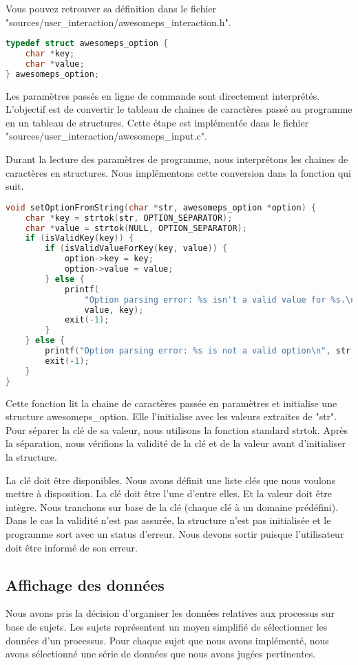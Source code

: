 Vous pouvez retrouver sa définition dans le fichier "sources/user\_interaction/awesomeps\_interaction.h".

\begin{lstlisting}[frame=single, language=c]
typedef struct awesomeps_option {
    char *key;
    char *value;
} awesomeps_option;
\end{lstlisting}

Les paramètres passés en ligne de commande sont directement interprétés. L'objectif est de convertir le tableau de chaines de caractères passé au programme en un tableau de structures. Cette étape est implémentée dans le fichier "sources/user\_interaction/awesomeps\_input.c".

Durant la lecture des paramètres de programme, nous interprétons les chaines de caractères en structures. Nous implémentons cette conversion dans la fonction qui suit.

\begin{lstlisting}[frame=single, language=c]
void setOptionFromString(char *str, awesomeps_option *option) {
    char *key = strtok(str, OPTION_SEPARATOR);
    char *value = strtok(NULL, OPTION_SEPARATOR);
    if (isValidKey(key)) {
        if (isValidValueForKey(key, value)) {
            option->key = key;
            option->value = value;
        } else {
            printf(
                "Option parsing error: %s isn't a valid value for %s.\n",
                value, key);
            exit(-1);
        }
    } else {
        printf("Option parsing error: %s is not a valid option\n", str);
        exit(-1);
    }
}
\end{lstlisting}

Cette fonction lit la chaine de caractères passée en paramètres et initialise une structure awesomeps\_option. Elle l'initialise avec les valeurs extraites de "str". Pour séparer la clé de sa valeur, nous utilisons la fonction standard strtok. Après la séparation, nous vérifions la validité de la clé et de la valeur avant d'initialiser la structure.

La clé doit être disponibles. Nous avons définit une liste clés que nous voulons mettre à disposition. La clé doit être l'une d'entre elles. Et la valeur doit être intègre. Nous tranchons sur base de la clé (chaque clé à un domaine prédéfini). Dans le cas la validité n'est pas assurée, la structure n'est pas initialisée et le programme sort avec un status d'erreur. Nous devons sortir puisque l'utilisateur doit être informé de son erreur.

\subsection{Affichage des données}
Nous avons pris la décision d'organiser les données relatives aux processus sur base de sujets. Les sujets représentent un moyen simplifié de sélectionner les données d'un processus. Pour chaque sujet que nous avons implémenté, nous avons sélectionné une série de données que nous avons jugées pertinentes.


